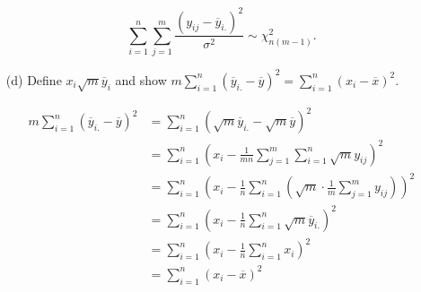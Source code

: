 \documentclass{tufte-book}
\begin{document}
\begin{enumerate}
\[ \sum_{i=1}^n \sum_{j=1}^m\frac{(y_{ij} - \overline{y}_{i.})^2}{\sigma^2} \sim \chi_{n(m-1)}^2. \]

\item[(d)] Define $x_i \sqrt{m}\overline{y}_i$ and show $m\sum_{i=1}^n(\overline{y}_{i.} - \overline{y})^2 = \sum_{i=1}^n(x_i-\overline{x})^2$.

\begin{align*}
m\sum_{i=1}^n(\overline{y}_{i.} - \overline{y})^2 &= \sum_{i=1}^n(\sqrt{m}\overline{y}_{i.} - \sqrt{m}\overline{y})^2 \\
&= \sum_{i=1}^n(x_i - \frac{1}{mn}\sum_{j=1}^m\sum_{i=1}^n\sqrt{m}y_{ij})^2 \\
&= \sum_{i=1}^n(x_i - \frac{1}{n}\sum_{i=1}^n(\sqrt{m}\cdot \frac{1}{m}\sum_{j=1}^my_{ij}))^2 \\
&=\sum_{i=1}^n(x_i - \frac{1}{n}\sum_{i=1}^n\sqrt{m}\overline{y}_{i.})^2 \\
&= \sum_{i=1}^n(x_i - \frac{1}{n}\sum_{i=1}^nx_i)^2 \\
&= \sum_{i=1}^n(x_i-\overline{x})^2
\end{align*}
\end{enumerate}
\end{document}
